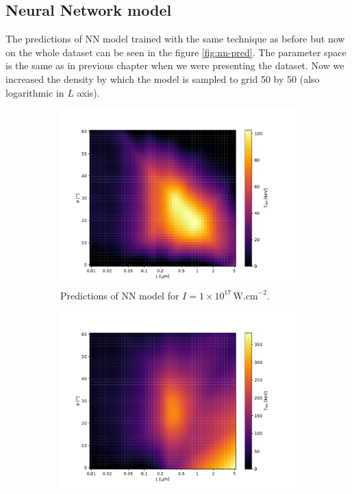 \subsection*{Neural Network model}
The predictions of NN model trained with the same technique as before but now on the whole dataset can be seen in the figure \ref{fig:nn-pred}. The parameter space is the same as in previous chapter when we were presenting the dataset. Now we increased the density by which the model is sampled to grid 50 by 50 (also logarithmic in $L$ axis).
\begin{figure}[ht]
	\centering
	\begin{subfigure}{0.49\textwidth}
		\centering
		\includegraphics[width=\textwidth]{figures/nn17_pred}
		\caption{Predictions of NN model for $I = 1 \times 10^{17} \, \mathrm{W.cm}^{-2}$.}
		\label{fig:nn-pred-a}
	\end{subfigure}
	\hfill
	\begin{subfigure}{0.49\textwidth}
		\centering
		\includegraphics[width=\textwidth]{figures/nn18_pred}

\end{subfigure}
\end{figure}
